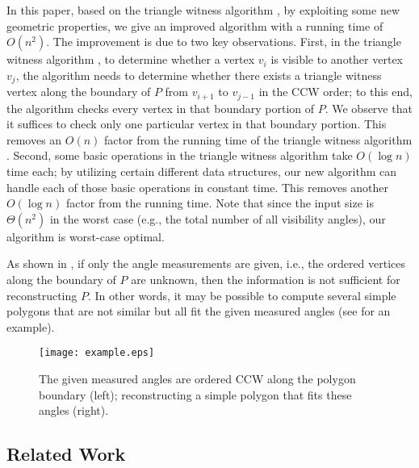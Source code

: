 \documentclass[11pt]{article}
\begin{document}
In this paper, based on the triangle witness algorithm
\cite{ref:DisserRe10}, by exploiting some new geometric properties, we
give an improved algorithm with a running time of $O(n^2)$. The 
improvement is due to two key observations. First, in the triangle
witness algorithm \cite{ref:DisserRe10}, to determine whether a vertex
$v_i$ is visible to another vertex $v_j$, the algorithm needs to
determine whether there exists a triangle witness vertex along the
boundary of $P$ from $v_{i+1}$ to $v_{j-1}$ in the CCW order; to this
end, the algorithm checks every vertex in that boundary portion of 
$P$. We observe that it suffices to check only one particular vertex in that
boundary portion. This removes an $O(n)$ factor from the running time of
the triangle witness algorithm \cite{ref:DisserRe10}. Second, some
basic operations in the triangle witness algorithm
\cite{ref:DisserRe10} take $O(\log n)$ time each; by utilizing certain
different  
data structures, our new algorithm can handle each of those
basic operations in constant time. 
This removes another $O(\log n)$ factor from the running time. Note that
since the input size is $\Theta(n^2)$ in the worst case (e.g., the
total number of all visibility angles), our algorithm is worst-case optimal.  

As shown in \cite{ref:DisserRe10}, if only the angle measurements are
given, i.e., the ordered vertices along the
boundary of $P$ are unknown, then the information is not sufficient for 
reconstructing $P$. In other words, it may be possible to compute several simple
polygons that are not similar but all fit the given measured angles (see
\cite{ref:DisserRe10} for an example). 

\begin{figure}[t]
\begin{minipage}[t]{\linewidth}
\begin{center}
\texttt{[image: example.eps]}
\caption{\footnotesize The given measured angles are ordered CCW along
the polygon boundary (left); reconstructing a simple polygon that fits these angles (right).
}\label{fig:example}
\end{center}
\end{minipage}
\end{figure}


\subsection{Related Work}
\end{document}

